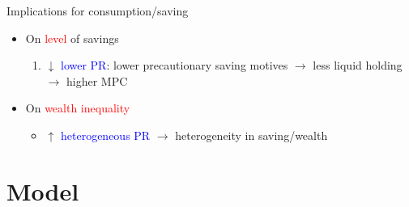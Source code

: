 \documentclass{beamer}
\begin{document}
\begin{frame}{Implications for consumption/saving}
	\begin{itemize}
		\item On \textcolor{red}{level} of savings
	\begin{enumerate}
		\item $\downarrow$ \textcolor{blue}{lower PR}: lower precautionary saving motives $\rightarrow$ less liquid holding $\rightarrow$ higher MPC
		\pause
	\end{enumerate}
\pause 
\item On \textcolor{red}{wealth inequality}
\begin{itemize}
	\item 	$\uparrow$ \textcolor{blue}{heterogeneous PR} $\rightarrow$ heterogeneity in saving/wealth
	\end{itemize}
	\end{itemize}
\end{frame}


\section{Model}
\end{document}
